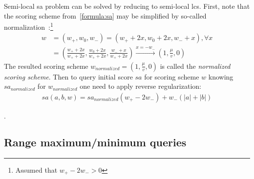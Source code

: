 Semi-local sa problem can be solved by reducing to semi-local lcs.
First, note that the scoring scheme from~\ref{formula:sa} may be simplified by so-called normalization~\cite{.}:\footnote{ Assumed that $w_{+}-2w_{-}>0$}\begin{equation}\label{weightNormalization}
  \begin{array}{ll}
    w &= (w_{+}, w_{0} , w_{-}) = (w_{+} +2x , w_{0} + 2x , w_{-} + x), \forall x\\
    &= ( \frac{w_{+} +2x}{w_{+} +2x} , \frac {w_{0} + 2x}{w_{+} +2x} , \frac{w_{-} + x}{w_{+} +2x})
    \overset{x=-w_{-}}{\to} (1,\frac{\mu}{v} ,0) 
  \end{array}
\end{equation}
The resulted scoring scheme $w_{normalized} = (1,\frac{\mu}{v} ,0)$ is called the \emph{normalized scoring scheme}.
Then to query initial score $sa$ for scoring scheme $w$ knowing $sa_{normalized}$ for $w_{normalized}$ one need to apply reverse regularization:
\begin{equation}
  \begin{aligned}
    sa(a,b,w) = sa_{normalized}  (w_{+} - 2w_{-}) +  w_{-} (|a| + |b|)
  \end{aligned}
\end{equation}

.





\subsection{Range maximum/minimum queries}

